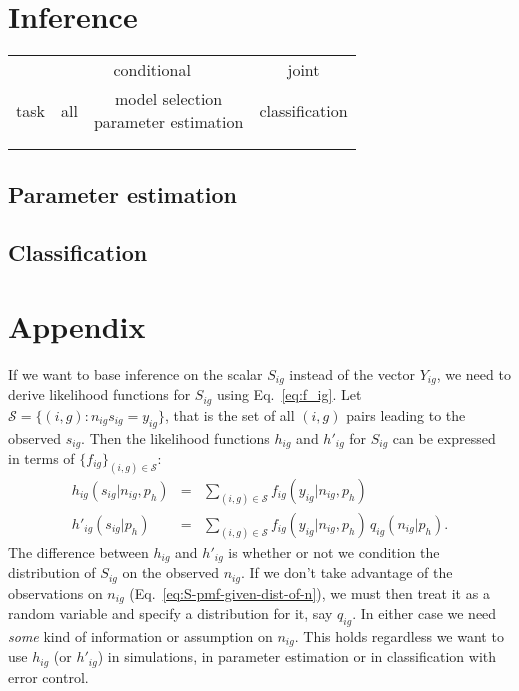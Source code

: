 \documentclass[letterpaper]{article}
\begin{document}
\section{Inference}

\begin{tabular}{c|c|c|c|}
& \multicolumn{2}{c}{conditional} & joint \\
task & all & \parbox{5 cm}{model selection\\parameter estimation} & classification \\
& & & \\
& & & \\
\end{tabular}

\subsection{Parameter estimation}

\subsection{Classification}

\section{Appendix}
\label{sec:appendix}

If we want to base inference on the scalar \(S_{ig}\) instead of the vector
\(Y_{ig}\), we need to derive likelihood functions for \(S_{ig}\) using
Eq.~\ref{eq:f_ig}.
Let \(\mathcal{S} = \{(i,g) : n_{ig} s_{ig} = y_{ig}\}\), that is the set of
all \((i,g)\) pairs leading to the observed \(s_{ig}\).  Then the likelihood
functions \(h_{ig}\) and \(h'_{ig}\) for \(S_{ig}\) can be expressed in terms
of \(\{f_{ig}\}_{(i,g)\in\mathcal{S}}\):
\begin{eqnarray}
\label{eq:S-pmf-given-n}
h_{ig}(s_{ig} | n_{ig}, p_h) &=& \sum_{(i,g)\in\mathcal{S}} f_{ig}(y_{ig} | n_{ig}, p_h)
\\
\label{eq:S-pmf-given-dist-of-n}
h'_{ig}(s_{ig} | p_h) &=& \sum_{(i,g)\in\mathcal{S}} f_{ig}(y_{ig} | n_{ig},
p_h) \, q_{ig}(n_{ig}|p_h).
\end{eqnarray}
The difference between \(h_{ig}\) and \(h'_{ig}\) is whether or not we
condition the distribution of \(S_{ig}\) on the observed \(n_{ig}\).  If we
don't take advantage of the observations on \(n_{ig}\) (Eq.~\ref{eq:S-pmf-given-dist-of-n}), we
must then treat it as a random variable and specify a distribution for it, say
\(q_{ig}\). In either case we need \emph{some} kind of information or
assumption on
\(n_{ig}\).  This holds regardless we want to use \(h_{ig}\) (or \(h'_{ig}\))
in simulations, in parameter estimation or in classification with error
control.
\end{document}

